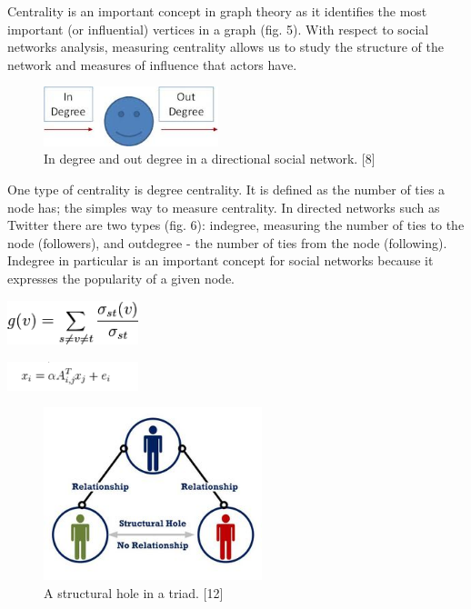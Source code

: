 \documentclass[conference,letterpaper]{IEEEtran}
\begin{document}
\indent
Centrality is an important concept in graph theory as it identifies the most important (or influential) vertices in a graph (fig. 5). With respect to social networks analysis, measuring centrality allows us to study the structure of the network and measures of influence that actors have.\\

\begin{center}
\begin{figure}[hb]
\centering
\includegraphics[width=2.0in]{degree_centrality}
\caption{
In degree and out degree in a directional social network. [8]
}
\label{fig_sim}
\end{figure}
\end{center}

One type of centrality is degree centrality. It is defined as the number of ties a node has; the simples way to measure centrality. In directed networks such as Twitter there are two types (fig. 6): indegree, measuring the number of ties to the node (followers), and outdegree - the number of ties from the node (following). Indegree in particular is an important concept for social networks because it expresses the popularity of a given node. \\


\centerline{
  \includegraphics[width=1.5in]{betweenness_centrality.png}
}

\centerline{
  \includegraphics[width=1.5in]{alpha_centrality.png}
}

\begin{center}
\begin{figure}[hb]
\centering
\includegraphics[width=2.5in]{structural_hole}
\caption{
A structural hole in a triad. [12]
}
\label{fig_sim}
\end{figure}
\end{center}
\end{document}
